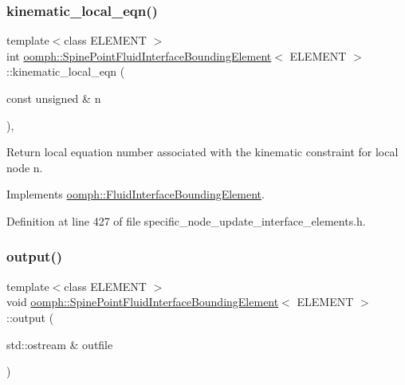 \subsubsection{\texorpdfstring{kinematic\+\_\+local\+\_\+eqn()}{kinematic\_local\_eqn()}}
{\footnotesize\ttfamily template$<$class E\+L\+E\+M\+E\+NT $>$ \\
int \hyperlink{classoomph_1_1SpinePointFluidInterfaceBoundingElement}{oomph\+::\+Spine\+Point\+Fluid\+Interface\+Bounding\+Element}$<$ E\+L\+E\+M\+E\+NT $>$\+::kinematic\+\_\+local\+\_\+eqn (\begin{DoxyParamCaption}\item[{const unsigned \&}]{n }\end{DoxyParamCaption})\hspace{0.3cm}{\ttfamily [inline]}, {\ttfamily [virtual]}}



Return local equation number associated with the kinematic constraint for local node n. 



Implements \hyperlink{classoomph_1_1FluidInterfaceBoundingElement_a12a0a6d7c3c1c1a5a0f42a57e60eab34}{oomph\+::\+Fluid\+Interface\+Bounding\+Element}.



Definition at line 427 of file specific\+\_\+node\+\_\+update\+\_\+interface\+\_\+elements.\+h.

\mbox{\label{classoomph_1_1SpinePointFluidInterfaceBoundingElement_ac35833173407cde9359c8163a0eba35c}} 
\subsubsection{\texorpdfstring{output()}{output()}\hspace{0.1cm}{\footnotesize\ttfamily [1/4]}}
{\footnotesize\ttfamily template$<$class E\+L\+E\+M\+E\+NT $>$ \\
void \hyperlink{classoomph_1_1SpinePointFluidInterfaceBoundingElement}{oomph\+::\+Spine\+Point\+Fluid\+Interface\+Bounding\+Element}$<$ E\+L\+E\+M\+E\+NT $>$\+::output (\begin{DoxyParamCaption}\item[{std\+::ostream \&}]{outfile }\end{DoxyParamCaption})\hspace{0.3cm}{\ttfamily [inline]}}



